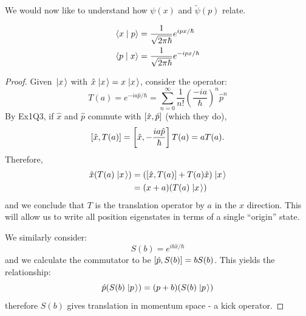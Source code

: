 \documentclass[../Main.tex]{subfiles}
\begin{document}
We would now like to understand how $\psi(x)$ and $\tilde{\psi}(p)$ relate.
\begin{proposition}
    \begin{equation}
        \begin{aligned}
            \langle x\mid p\rangle &= \frac{1}{\sqrt{2\pi \hbar}} e^{ipx / \hbar} \\
            \langle p\mid x\rangle &= \frac{1}{\sqrt{2\pi \hbar}} e^{-ipx / \hbar}
        \end{aligned}
        \label{eqnPXRelations}
    \end{equation}
    \label{propXPProducts}
\end{proposition}
\begin{proof}
    Given $\left.\left|x\right.\right\rangle$ with $\hat{x} \left.\left|x\right.\right\rangle = x\left.\left|x\right.\right\rangle$, consider the operator:
    \begin{equation*}
        T(a) = e^{-ia\hat{p} / \hbar} = \sum_{n=0}^{\infty} \frac{1}{n!} \left(\frac{-ia}{\hbar}\right)^n \hat{p}^n
    \end{equation*}
    By Ex1Q3, if $\hat{x}$ and $\hat{p}$ commute with $\left[\hat{x}, \hat{p}\right]$ (which they do),
    \begin{equation*}
        \left[\hat{x}, T(a)\right] = \left[\hat{x}, -\frac{ia\hat{p}}{\hbar}\right]T(a) = a T(a).
    \end{equation*}
    Therefore,
    \begin{align*}
        \hat{x} (T(a) \left.\left|x\right.\right\rangle) &= \left(\left[\hat{x}, T(a)\right] + T(a)\hat{x}\right)\left.\left|x\right.\right\rangle \\
        &= (x + a)(T(a) \left.\left|x\right.\right\rangle)
    \end{align*}
    and we conclude that $T$ is the translation operator by $a$ in the $x$ direction. This will allow us to write all position eigenstates in terms of a single ``origin'' state.

    We similarly consider:
    \begin{equation*}
        S(b) = e^{ib\hat{x} / \hbar}
    \end{equation*}
    and we calculate the commutator to be $\left[\hat{p}, S(b)\right] = bS(b)$. This yields the relationship:
    \begin{equation*}
        \hat{p}(S(b) \left.\left|p\right.\right\rangle) = (p + b)(S(b)\left.\left|p\right.\right\rangle)
    \end{equation*}
    therefore $S(b)$ gives translation in momentum space - a kick operator.


\end{proof}
\end{document}
